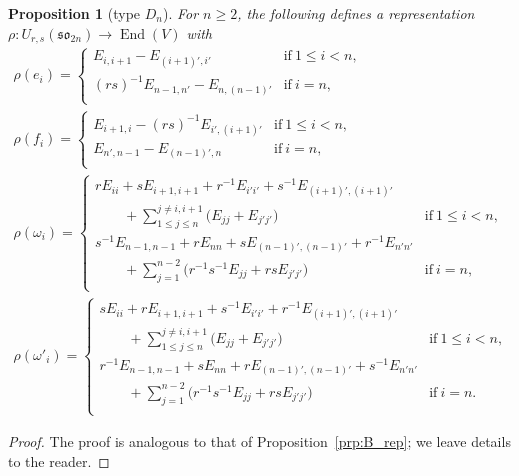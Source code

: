 \documentclass[10pt,a4paper]{amsart}
\numberwithin{equation}{section}
\newtheorem{Proposition}[Theorem]{Proposition}
 { \theoremstyle{definition}
\newtheorem{Definition}[Theorem]{Definition}
\newtheorem{Note}[Theorem]{Note}
\newtheorem{Example}[Theorem]{Example}
\newtheorem{Remark}[Theorem]{Remark} }
\DeclareMathOperator{\End}{End}
\newcommand{\sso}{\mathfrak{so}}
\begin{document}
\begin{Proposition}[type $D_n$]\label{prp:D_rep}
For $n \ge 2$, the following defines a representation $\rho\colon  U_{r,s}(\sso_{2n}) \to \End(V)$ with
\begin{gather*}
 \rho(e_{i}) =
 \begin{cases}
 E_{i,i+1} - E_{(i + 1)',i'} & \mathrm{if}\ 1\leq i<n, \\
 (rs)^{-1}E_{n - 1, n'} - E_{n,(n-1)'} & \mathrm{if}\ i=n, \\
 \end{cases} \\
 \rho(f_{i}) =
 \begin{cases}
 E_{i + 1,i} - (rs)^{-1}E_{i', (i + 1)'} & \mathrm{if}\ 1\leq i<n, \\
 E_{n', n-1} - E_{(n-1)',n} & \mathrm{if}\ i=n ,\\
 \end{cases} \\
 \rho(\omega_{i}) =
 \begin{cases}
 \displaystyle rE_{ii} + sE_{i + 1,i + 1} + r^{-1}E_{i'i'} + s^{-1}E_{(i + 1)', (i+1)'} \\
 \displaystyle\qquad{}+\sum_{1\leq j\leq n}^{j \neq i,i + 1} \bigl(E_{jj} + E_{j'j'}\bigr)
 & \mathrm{if}\ 1\leq i<n ,\\
 \displaystyle s^{-1}E_{n-1,n-1} + rE_{nn} + sE_{(n-1)',(n-1)'} + r^{-1}E_{n'n'} \\
 \displaystyle\qquad{}+ \sum_{j = 1}^{n-2}\bigl(r^{-1}s^{-1}E_{jj} + rsE_{j'j'}\bigr)
 & \mathrm{if}\ i = n ,\\
 \end{cases} \\
 \rho(\omega'_{i}) =
 \begin{cases}
 \displaystyle sE_{ii} + rE_{i + 1,i + 1} + s^{-1}E_{i'i'} + r^{-1}E_{(i + 1)',(i + 1)'} \\
 \displaystyle\qquad{}+\sum_{1\leq j\leq n}^{j \neq i,i + 1} \bigl(E_{jj} + E_{j'j'}\bigr)
 & \mathrm{if}\ 1\leq i<n ,\\
 \displaystyle r^{-1}E_{n-1,n-1} + sE_{nn} + rE_{(n-1)',(n-1)'} + s^{-1}E_{n'n'} \\
 \displaystyle\qquad{}+ \sum_{j = 1}^{n-2}\bigl(r^{-1}s^{-1}E_{jj} + rsE_{j'j'}\bigr)
 & \mathrm{if}\ i = n. \\
\end{cases}	 	
\end{gather*}
\end{Proposition}


\begin{proof}
The proof is analogous to that of Proposition~\ref{prp:B_rep}; we leave details to the reader.
\end{proof}
\end{document}
